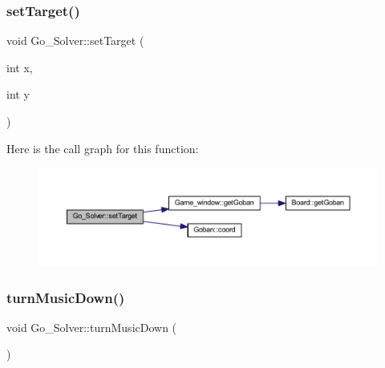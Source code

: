 \mbox{\label{class_go___solver_ab2a2c57a24b076a6729e01504ef25377}} 
\subsubsection{\texorpdfstring{set\+Target()}{setTarget()}\hspace{0.1cm}{\footnotesize\ttfamily [2/2]}}
{\footnotesize\ttfamily void Go\+\_\+\+Solver\+::set\+Target (\begin{DoxyParamCaption}\item[{int}]{x,  }\item[{int}]{y }\end{DoxyParamCaption})}

Here is the call graph for this function\+:
\nopagebreak
\begin{figure}[H]
\begin{center}
\leavevmode
\includegraphics[width=350pt]{class_go___solver_ab2a2c57a24b076a6729e01504ef25377_cgraph}
\end{center}
\end{figure}
\mbox{\label{class_go___solver_a9bf8a0287fac1692ddf3b640ae1b04fe}} 
\subsubsection{\texorpdfstring{turn\+Music\+Down()}{turnMusicDown()}}
{\footnotesize\ttfamily void Go\+\_\+\+Solver\+::turn\+Music\+Down (\begin{DoxyParamCaption}{ }\end{DoxyParamCaption})}

